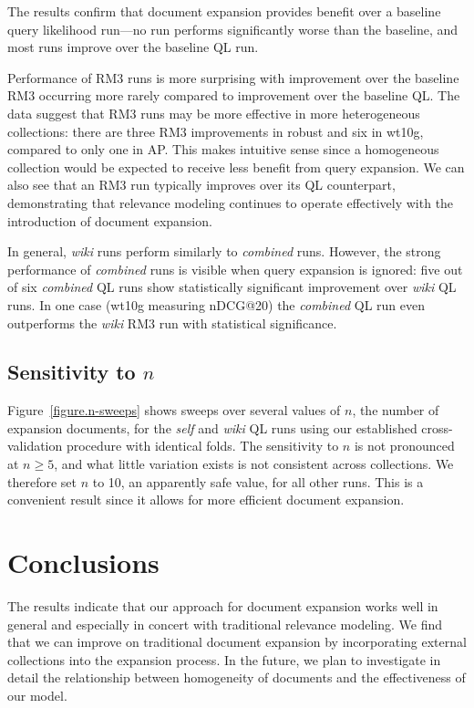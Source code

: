 \documentclass[sigconf]{acmart}
\begin{document}
The results confirm that document expansion provides benefit over a baseline query likelihood run---no run performs significantly worse than the baseline, and most runs improve over the baseline QL run. %

Performance of RM3 runs is more surprising with improvement over the baseline RM3 occurring more rarely compared to improvement over the baseline QL. The data suggest that RM3 runs may be more effective in more heterogeneous collections: there are three RM3 improvements in robust and six in wt10g, compared to only one in AP. This makes intuitive sense since a homogeneous collection would be expected to receive less benefit from query expansion. We can also see that an RM3 run typically improves over its QL counterpart, demonstrating that relevance modeling continues to operate effectively with the introduction of document expansion.

In general, \textit{wiki} runs perform similarly to \textit{combined} runs. However, the strong performance of \textit{combined} runs is visible when query expansion is ignored: five out of six \textit{combined} QL runs show statistically significant improvement over \textit{wiki} QL runs. In one case (wt10g measuring nDCG@20) the \textit{combined} QL run even outperforms the \textit{wiki} RM3 run with statistical significance.

\subsection{Sensitivity to \boldmath$n$}\label{section.n-sensitivity}

Figure~\ref{figure.n-sweeps} shows sweeps over several values of $n$, the number of expansion documents, for the \textit{self} and \textit{wiki} QL runs using our established cross-validation procedure with identical folds. The sensitivity to $n$ is not pronounced at $n \geq 5$, and what little variation exists is not consistent across collections. We therefore set $n$ to 10, an apparently safe value, for all other runs. This is a convenient result since it allows for more efficient document expansion.

\section{Conclusions}\label{section.conclusions}

The results indicate that our approach for document expansion works well in general and especially in concert with traditional relevance modeling. We find that we can improve on traditional document expansion by incorporating external collections into the expansion process. In the future, we plan to investigate in detail the relationship between homogeneity of documents and the effectiveness of our model.
\end{document}
